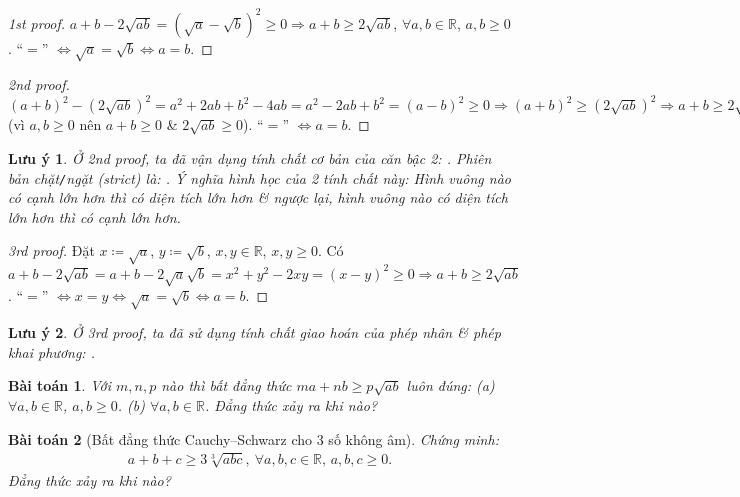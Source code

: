 \documentclass{article}
\newtheorem{baitoan}{Bài toán}
\newtheorem{luuy}{Lưu ý}
\begin{document}
\begin{proof}[1st proof]
	$a + b - 2\sqrt{ab} = (\sqrt{a} - \sqrt{b})^2\ge0\Rightarrow a + b\ge2\sqrt{ab}$, $\forall a,b\in\mathbb{R}$, $a,b\ge 0$. ``$=$'' $\Leftrightarrow\sqrt{a} = \sqrt{b}\Leftrightarrow a = b$.
\end{proof}

\begin{proof}[2nd proof]
	$(a + b)^2 - (2\sqrt{ab})^2 = a^2 + 2ab + b^2 - 4ab = a^2 - 2ab + b^2 = (a - b)^2\ge0\Rightarrow(a + b)^2\ge(2\sqrt{ab})^2\Rightarrow a + b\ge2\sqrt{ab}$ (vì $a,b\ge0$ nên $a + b\ge0$ \& $2\sqrt{ab}\ge0$). ``$=$'' $\Leftrightarrow a = b$.
\end{proof}

\begin{luuy}
	Ở 2nd proof, ta đã vận dụng tính chất cơ bản của căn bậc 2: . Phiên bản chặt\emph{\texttt{/}}ngặt (strict) là: . Ý nghĩa hình học của 2 tính chất này: Hình vuông nào có cạnh lớn hơn thì có diện tích lớn hơn \& ngược lại, hình vuông nào có diện tích lớn hơn thì có cạnh lớn hơn.
\end{luuy}

\begin{proof}[3rd proof]
	Đặt $x\coloneqq\sqrt{a}$, $y\coloneqq\sqrt{b}$, $x,y\in\mathbb{R}$, $x,y\ge0$. Có $a + b - 2\sqrt{ab} = a + b - 2\sqrt{a}\sqrt{b} = x^2 + y^2 - 2xy = (x - y)^2\ge0\Rightarrow a + b\ge2\sqrt{ab}$. ``$=$'' $\Leftrightarrow x = y\Leftrightarrow\sqrt{a} = \sqrt{b}\Leftrightarrow a = b$.
\end{proof}

\begin{luuy}
	Ở 3rd proof, ta đã sử dụng tính chất giao hoán của phép nhân \& phép khai phương: .
\end{luuy}

\begin{baitoan}
	Với $m,n,p$ nào thì bất đẳng thức $ma + nb\ge p\sqrt{ab}$ luôn đúng: (a) $\forall a,b\in\mathbb{R}$, $a,b\ge0$. (b) $\forall a,b\in\mathbb{R}$. Đẳng thức xảy ra khi nào?
\end{baitoan}

\begin{baitoan}[Bất đẳng thức Cauchy--Schwarz cho 3 số không âm]
	Chứng minh:
	\begin{align*}
		\boxed{a + b + c\ge3\sqrt[3]{abc},\ \forall a,b,c\in\mathbb{R},\,a,b,c\ge 0.}
	\end{align*}
	Đẳng thức xảy ra khi nào?
\end{baitoan}
\end{document}
